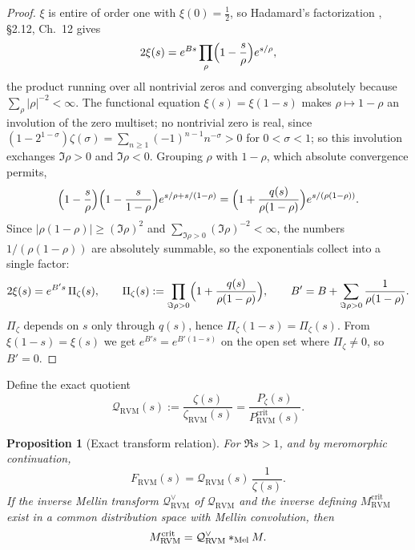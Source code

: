\documentclass[11pt,reqno]{amsart}
\makeatletter
\let\CG@origcite\cite
\renewcommand*{\cite}[2][]{\def\CG@citekey{#2}%
  \ifx\relax#1\relax\CG@origcite{#2}\else\CG@origcite[#1]{#2}\fi}
\numberwithin{equation}{section}
\theoremstyle{plain}
\newtheorem{proposition}[theorem]{Proposition}
\theoremstyle{definition}
\theoremstyle{remark}
\newcommand{\Mell}{\ast_{\rm Mel}}
\newcommand{\RVM}{\mathrm{RVM}}
\newcommand{\crit}{\mathrm{crit}}
\makeatother
\begin{document}
\begin{proof}
$\xi$ is entire of order one with $\xi(0)=\tfrac12$, so Hadamard's factorization \cite{Hadamard1896}, \cite[\S2.12]{Titchmarsh1986}, \cite[Ch.~12]{Davenport1980} gives
\begin{equation}\label{eq:hadamard-general}
 2\xi(s)=e^{Bs}\prod_{\rho}\Bigl(1-\frac s\rho\Bigr)e^{s/\rho},
\end{equation}
the product running over all nontrivial zeros and converging absolutely because $\sum_\rho|\rho|^{-2}<\infty$.  The functional equation $\xi(s)=\xi(1-s)$ makes $\rho\mapsto1-\rho$ an involution of the zero multiset; no nontrivial zero is real, since $(1-2^{1-\sigma})\zeta(\sigma)=\sum_{n\ge1}(-1)^{n-1}n^{-\sigma}>0$ for $0<\sigma<1$; so this involution exchanges $\Im\rho>0$ and $\Im\rho<0$.  Grouping $\rho$ with $1-\rho$, which absolute convergence permits,
\begin{equation}\label{eq:pair-factor}
 \Bigl(1-\frac s\rho\Bigr)\Bigl(1-\frac s{1-\rho}\Bigr)e^{s/\rho+s/(1-\rho)}
 =\Bigl(1+\frac{q(s)}{\rho(1-\rho)}\Bigr)e^{s/(\rho(1-\rho))}.
\end{equation}
Since $|\rho(1-\rho)|\ge(\Im\rho)^2$ and $\sum_{\Im\rho>0}(\Im\rho)^{-2}<\infty$, the numbers $1/(\rho(1-\rho))$ are absolutely summable, so the exponentials collect into a single factor:
\begin{equation}\label{eq:hadamard-exp}
 2\xi(s)=e^{B's}\,\Pi_\zeta(s),\qquad \Pi_\zeta(s):=\prod_{\Im\rho>0}\Bigl(1+\frac{q(s)}{\rho(1-\rho)}\Bigr),\qquad B'=B+\sum_{\Im\rho>0}\frac1{\rho(1-\rho)} .
\end{equation}
$\Pi_\zeta$ depends on $s$ only through $q(s)$, hence $\Pi_\zeta(1-s)=\Pi_\zeta(s)$.  From $\xi(1-s)=\xi(s)$ we get $e^{B's}=e^{B'(1-s)}$ on the open set where $\Pi_\zeta\ne0$, so $B'=0$.
\end{proof}

Define the exact quotient
\begin{equation}\label{eq:Q-RVM}
 \mathcal Q_{\RVM}(s):=\frac{\zeta(s)}{\zeta_{\RVM}(s)}=\frac{P_\zeta(s)}{P_{\RVM}^{\crit}(s)}.
\end{equation}

\begin{proposition}[Exact transform relation]\label{prop:M-transform-relation}
For $\Re s>1$, and by meromorphic continuation,
\begin{equation}\label{eq:M-transform-relation}
 F_{\RVM}(s)=\mathcal Q_{\RVM}(s)\,\frac1{\zeta(s)} .
\end{equation}
If the inverse Mellin transform $\mathcal Q_{\RVM}^{\vee}$ of $\mathcal Q_{\RVM}$ and the inverse defining $M_{\RVM}^{\crit}$ exist in a common distribution space with Mellin convolution, then
\begin{equation}\label{eq:M-convolution}
 M_{\RVM}^{\crit}=\mathcal Q_{\RVM}^{\vee}\Mell M .
\end{equation}
\end{proposition}
\end{document}
